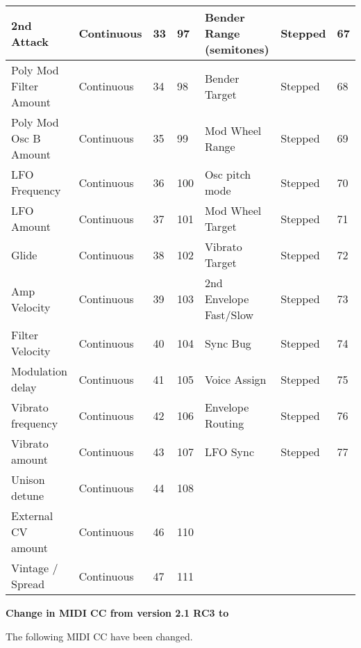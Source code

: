 \begin{longtable}[l]{ p{5cm}|p{2cm}|p{1.5cm}|p{1.5cm}|p{5cm}|p{2cm}|p{1cm}}
2nd Attack  &  Continuous  & 33 & 97 &  Bender Range (semitones)  &  Stepped  &  67 \\ \hline
Poly Mod Filter Amount  &  Continuous  & 34 & 98 &  Bender Target  &  Stepped  &  68 \\ \hline
Poly Mod Osc B Amount  &  Continuous  & 35 & 99 &  Mod Wheel Range  &  Stepped  &  69 \\ \hline
LFO Frequency  &  Continuous  & 36 & 100 &  Osc pitch mode  &  Stepped  &  70 \\ \hline
LFO Amount  &  Continuous  & 37 & 101 &  Mod Wheel Target  &  Stepped  &  71 \\ \hline
Glide  &  Continuous  & 38 & 102 &  Vibrato Target  &  Stepped  &  72 \\ \hline
Amp Velocity  &  Continuous  & 39 & 103 &   2nd Envelope Fast/Slow  &  Stepped  &  73 \\ \hline
Filter Velocity  &  Continuous  & 40 & 104 &  Sync Bug  &  Stepped  &  74 \\ \hline
Modulation delay  &  Continuous  & 41 & 105 &  Voice Assign  &  Stepped  &  75 \\ \hline
Vibrato frequency  &  Continuous  & 42 & 106 &  Envelope Routing  &  Stepped  &  76 \\ \hline
Vibrato amount  &  Continuous  & 43 & 107 &  LFO Sync  &  Stepped  &  77 \\ \hline
Unison detune  &  Continuous  & 44 & 108 &    &    &   \\ \hline
External CV amount  &  Continuous  & 46 & 110 &  &  &   \\ \hline 
Vintage / Spread  &  Continuous  & 47 & 111 &  &  &   \\ \hline 
 
\end{longtable}

\normalsize

\textbf{Change in MIDI CC from version 2.1 RC3 to \version}

The following MIDI CC have been changed.

